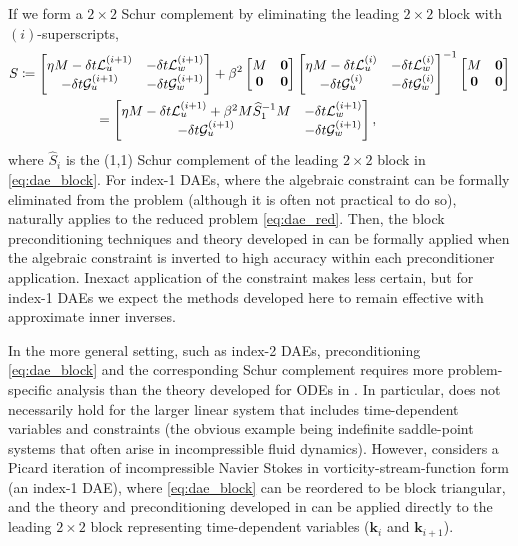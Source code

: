 \documentclass[review]{siamart}
\begin{document}
%
If we form a $2\times 2$ Schur complement by eliminating the leading
$2\times 2$ block with $(i)$-superscripts,
%
\begin{align}\nonumber
S \coloneqq \begin{bmatrix} \eta M - \delta t\mathcal{L}_{u}^{(i+1)} &
	-\delta t\mathcal{L}_{w}^{(i+1)} \\ -\delta t\mathcal{G}_{u}^{(i+1)} &
		-\delta t\mathcal{G}_w^{(i+1)} \end{bmatrix}&
	+ \beta^2 \begin{bmatrix} M & \mathbf{0} \\\mathbf{0} & \mathbf{0} \end{bmatrix}
	\begin{bmatrix} \eta M - \delta t\mathcal{L}_{u}^{(i)} &
	-\delta t\mathcal{L}_{w}^{(i)} \\ -\delta t\mathcal{G}_{u}^{(i)} &
		-\delta t\mathcal{G}_w^{(i)} \end{bmatrix}^{-1}
	\begin{bmatrix} M & \mathbf{0} \\\mathbf{0} & \mathbf{0} \end{bmatrix} \\
&\hspace{-20ex}
= \begin{bmatrix} \eta M - \delta t\mathcal{L}_{u}^{(i+1)} + \beta^2M \widehat{S}_1^{-1}M &
	-\delta t\mathcal{L}_{w}^{(i+1)} \\ -\delta t\mathcal{G}_{u}^{(i+1)} &
		-\delta t\mathcal{G}_w^{(i+1)} \end{bmatrix},\label{eq:dae_red}
\end{align}
%
where $\widehat{S}_i$ is the (1,1) Schur complement of the leading $2\times2$
block in \eqref{eq:dae_block}.
For index-1 DAEs, where the algebraic constraint can be formally eliminated from
the problem (although it is often not practical to do so), 
naturally applies to the reduced problem \eqref{eq:dae_red}. Then, the block preconditioning
techniques and theory developed in  can be formally applied
when the algebraic constraint is inverted to high accuracy within each
preconditioner application. Inexact application of the constraint makes
 less certain, but for index-1 DAEs we expect the methods
developed here to remain effective with approximate inner inverses.

In the more general setting, such as index-2 DAEs, preconditioning
\eqref{eq:dae_block} and the corresponding Schur complement requires more
problem-specific analysis than the theory developed for ODEs in
. In particular,  does not necessarily hold for
the larger linear system that includes time-dependent variables and constraints
(the obvious example being indefinite saddle-point systems that often arise in
incompressible fluid dynamics). However,  considers a
Picard iteration of incompressible Navier Stokes in vorticity-stream-function
form (an index-1 DAE), where \eqref{eq:dae_block} can be reordered to be block
triangular, and the theory and preconditioning developed in 
can be applied directly to the leading $2\times 2$ block representing
time-dependent variables ($\mathbf{k}_i$ and $\mathbf{k}_{i+1}$). 
\end{document}
